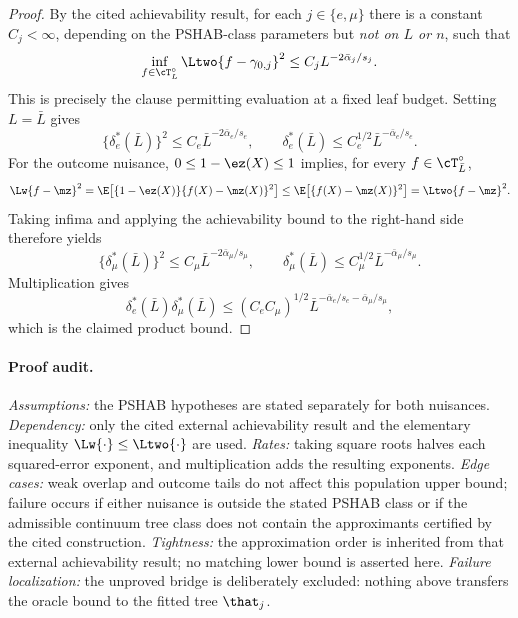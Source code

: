 \begin{remark}
\begin{proof}
By the cited achievability result, for each $j\in\{e,\mu\}$ there is a
constant $C_j<\infty$, depending on the PSHAB-class parameters but
\emph{not on $L$ or $n$}, such that
\[
  \inf_{f\in\cT_L^\circ}
  \Ltwo{f-\gamma_{0,j}}^2
  \le C_jL^{-2\bar\alpha_j/s_j}.
\]
This is precisely the clause permitting evaluation at a fixed leaf budget.
Setting $L=\bar L$ gives
\[
  \bigl\{\delta_e^*(\bar L)\bigr\}^2
  \le C_e\bar L^{-2\bar\alpha_e/s_e},
  \qquad
  \delta_e^*(\bar L)
  \le C_e^{1/2}\bar L^{-\bar\alpha_e/s_e}.
\]
For the outcome nuisance, $0\le1-\ez(X)\le1$ implies, for every
$f\in\cT_{\bar L}^{\circ}$,
\[
  \Lw{f-\mz}^2
  =\E\!\left[\{1-\ez(X)\}\{f(X)-\mz(X)\}^2\right]
  \le\E\!\left[\{f(X)-\mz(X)\}^2\right]
  =\Ltwo{f-\mz}^2.
\]
Taking infima and applying the achievability bound to the right-hand side
therefore yields
\[
  \bigl\{\delta_\mu^*(\bar L)\bigr\}^2
  \le C_\mu\bar L^{-2\bar\alpha_\mu/s_\mu},
  \qquad
  \delta_\mu^*(\bar L)
  \le C_\mu^{1/2}\bar L^{-\bar\alpha_\mu/s_\mu}.
\]
Multiplication gives
\[
  \delta_e^*(\bar L)\delta_\mu^*(\bar L)
  \le (C_eC_\mu)^{1/2}
     \bar L^{-\bar\alpha_e/s_e-\bar\alpha_\mu/s_\mu},
\]
which is the claimed product bound.
\end{proof}

\paragraph{Proof audit.}
\emph{Assumptions:} the PSHAB hypotheses are stated separately for both
nuisances.  \emph{Dependency:} only the cited external achievability result
and the elementary inequality $\Lw{\cdot}\le\Ltwo{\cdot}$ are used.
\emph{Rates:} taking square roots halves each squared-error exponent, and
multiplication adds the resulting exponents.
\emph{Edge cases:} weak overlap and outcome tails do not affect this
population upper bound; failure occurs if either nuisance is outside the stated
PSHAB class or if the admissible continuum tree class does not contain the
approximants certified by the cited construction.
\emph{Tightness:} the approximation order is inherited from that external
achievability result; no matching lower bound is asserted here.
\emph{Failure localization:} the unproved bridge is deliberately excluded:
nothing above transfers the oracle bound to the fitted tree $\that_j$.
\end{remark}


%


